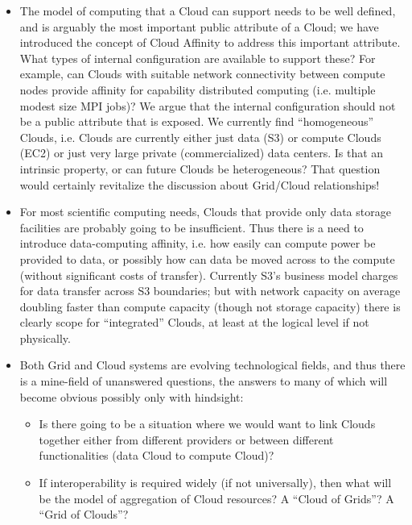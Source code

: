 \documentclass[conference,final]{IEEEtran}
\begin{document}
 \begin{itemize}

  \item The model of computing that a Cloud can support needs to be
  well defined, and is arguably the most important public attribute of
  a Cloud; we have introduced the concept of Cloud Affinity to address
  this important attribute.  What types of internal configuration are
  available to support these?  For example, can Clouds with suitable
  network connectivity between compute nodes provide affinity for
  capability distributed computing (i.e. multiple modest size MPI
  jobs)?  We argue that the internal configuration should not be a
  public attribute that is exposed.  We currently find ``homogeneous''
  Clouds, i.e. Clouds are currently either just data (S3) or compute
  Clouds (EC2) or just very large private (commercialized) data
  centers.  Is that an intrinsic property, or can future Clouds be
  heterogeneous?  That question would certainly revitalize the
  discussion about Grid/Cloud relationships!

  \item For most scientific computing needs, Clouds that provide only
  data storage facilities are probably going to be insufficient.  Thus
  there is a need to introduce data-computing affinity, i.e. how
  easily can compute power be provided to data, or possibly how can
  data be moved across to the compute (without significant costs of
  transfer).  Currently S3's business model charges for data transfer
  across S3 boundaries; but with network capacity on average doubling
  faster than compute capacity (though not storage capacity) there is
  clearly scope for ``integrated'' Clouds, at least at the logical
  level if not physically.
 
  \item Both Grid and Cloud systems are evolving technological fields,
  and thus there is a mine-field of unanswered questions, the answers
  to many of which will become obvious possibly only with hindsight:
  \\[-1.5em]
  
   \begin{itemize}
  
    \item Is there going to be a situation where we would want to link
    Clouds together either from different providers or between
    different functionalities (data Cloud to compute Cloud)?  
  
    \item If interoperability is required widely (if not universally),
    then what will be the model of aggregation of Cloud resources? A
    ``Cloud of Grids''?  A ``Grid of Clouds''?  
  

\end{itemize}
\end{itemize}
\end{document}
